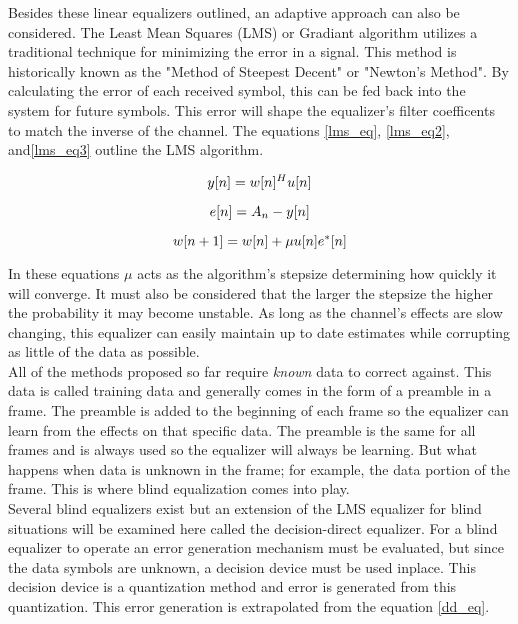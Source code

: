 Besides these linear equalizers outlined, an adaptive approach can also be considered.  The Least Mean Squares (LMS) or Gradiant algorithm utilizes a traditional technique for minimizing the error in a signal.  This method is historically known as the "Method of Steepest Decent" or "Newton's Method". By calculating the error of each received symbol, this can be fed back into the system for future symbols.  This error will shape the equalizer's filter coefficents to match the inverse of the channel.  The equations \ref{lms_eq}, \ref{lms_eq2}, and\ref{lms_eq3} outline the LMS algorithm.

\begin{equation}\label{lms_eq}
y[n]=w[n]^{H}u[n]\\
\end{equation}

\begin{equation}\label{lms_eq2}
e[n]=A_{n}-y[n]\\
\end{equation}

\begin{equation}\label{lms_eq3}
w[n+1]=w[n]+\mu u[n]e^{*}[n]\\ 
\end{equation}

In these equations \(\mu\) acts as the algorithm's stepsize determining how quickly it will converge.  It must also be considered that the larger the stepsize the higher the probability it may become unstable.  As long as the channel's effects are slow changing, this equalizer can easily maintain up to date estimates while corrupting as little of the data as possible.\\  

All of the methods proposed so far require \textit{known} data to correct against.  This data is called training data and generally comes in the form of a preamble in a frame.  The preamble is added to the beginning of each frame so the equalizer can learn from the effects on that specific data.  The preamble is the same for all frames and is always used so the equalizer will always be learning.  But what happens when data is unknown in the frame; for example, the data portion of the frame.  This is where blind equalization comes into play.\\

Several blind equalizers exist but an extension of the LMS equalizer for blind situations will be examined here called the decision-direct equalizer.  For a blind equalizer to operate an error generation mechanism must be evaluated, but since the data symbols are unknown, a decision device must be used inplace.  This decision device is a quantization method and error is generated from this quantization.  This error generation is extrapolated from the equation \ref{dd_eq}.

